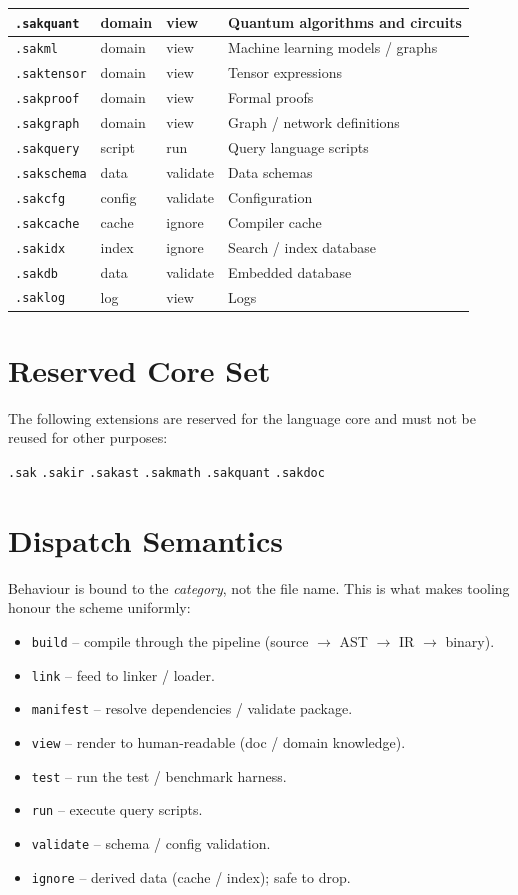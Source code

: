 \documentclass[11pt,a4paper]{article}
\begin{document}
\begin{longtable}{|l|l|l|p{6.5cm}|}
\hline
\texttt{.sakquant} & domain & view & Quantum algorithms and circuits \\
\hline
\texttt{.sakml} & domain & view & Machine learning models / graphs \\
\hline
\texttt{.saktensor} & domain & view & Tensor expressions \\
\hline
\texttt{.sakproof} & domain & view & Formal proofs \\
\hline
\texttt{.sakgraph} & domain & view & Graph / network definitions \\
\hline
\texttt{.sakquery} & script & run & Query language scripts \\
\hline
\texttt{.sakschema} & data & validate & Data schemas \\
\hline
\texttt{.sakcfg} & config & validate & Configuration \\
\hline
\texttt{.sakcache} & cache & ignore & Compiler cache \\
\hline
\texttt{.sakidx} & index & ignore & Search / index database \\
\hline
\texttt{.sakdb} & data & validate & Embedded database \\
\hline
\texttt{.saklog} & log & view & Logs \\
\hline
\end{longtable}

\section{Reserved Core Set}
The following extensions are reserved for the language core and must not be
reused for other purposes:
\begin{center}
\texttt{.sak} \texttt{.sakir} \texttt{.sakast} \texttt{.sakmath} \texttt{.sakquant} \texttt{.sakdoc}
\end{center}

\section{Dispatch Semantics}
Behaviour is bound to the \textit{category}, not the file name. This is what
makes tooling honour the scheme uniformly:
\begin{itemize}
\item \texttt{build} -- compile through the pipeline (source $\to$ AST $\to$ IR $\to$ binary).
\item \texttt{link} -- feed to linker / loader.
\item \texttt{manifest} -- resolve dependencies / validate package.
\item \texttt{view} -- render to human-readable (doc / domain knowledge).
\item \texttt{test} -- run the test / benchmark harness.
\item \texttt{run} -- execute query scripts.
\item \texttt{validate} -- schema / config validation.
\item \texttt{ignore} -- derived data (cache / index); safe to drop.
\end{itemize}
\end{document}
